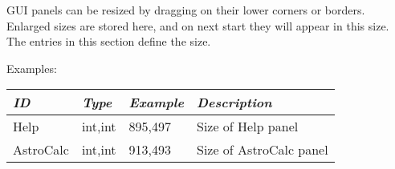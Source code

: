 GUI panels can be resized by dragging on their lower corners or borders.  
Enlarged sizes are stored here, and on next start they will appear in this size.
The entries in this section define the size.

Examples:

\begin{longtabu} to \textwidth {l|l|l|X}
\toprule
\emph{ID}     & \emph{Type} & \emph{Example}&\emph{Description}      \\\midrule
Help          & int,int     &  895,497      & Size of Help panel     \\\midrule
AstroCalc     & int,int     &  913,493      & Size of AstroCalc panel\\\bottomrule
\end{longtabu}





